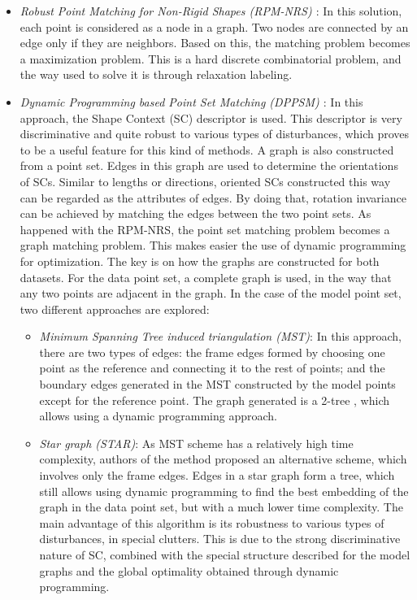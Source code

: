 \begin{itemize}
 \item \textit{Robust Point Matching for Non-Rigid Shapes (RPM-NRS) \citep{zheng2006robust}}: In this solution, each 
point is considered as a node in a graph. Two nodes are connected by an edge only if they are neighbors. Based on this, 
the matching problem becomes a maximization problem. This is a hard discrete combinatorial problem, and the way used to 
solve it is through relaxation labeling.
 \item \textit{Dynamic Programming based Point Set Matching (DPPSM) \citep{lian2012rotation}}: In this approach, the 
Shape Context (SC) descriptor is used. This descriptor is very discriminative and quite robust to various types of 
disturbances, which proves to be a useful feature for this kind of methods. A graph is also 
constructed from a point set. Edges in this graph are used to determine the orientations of SCs. Similar to lengths or 
directions, oriented SCs constructed this way can be regarded as the attributes of edges. By doing that, rotation 
invariance can be achieved by matching the edges between the two point sets. As happened with the RPM-NRS, the point set 
matching problem becomes a graph matching problem. This makes easier the use of dynamic programming for optimization.
 The key is on how the graphs are constructed for both datasets. For the data point set, a complete graph is used, in 
the way that any two points are adjacent in the graph. In the case of the model point set, two different approaches are 
explored:
 \begin{itemize}
  \item \textit{Minimum Spanning Tree induced triangulation (MST)}: In this approach, there are two types of edges: the frame edges formed by choosing one point as the reference and connecting it to the rest of points; and the boundary edges generated in the MST constructed by the model points except for the reference point.
  The graph generated is a 2-tree \citep{west2001introduction}, which allows using a dynamic programming approach.
  \item \textit{Star graph (STAR)}: As MST scheme has a relatively high time complexity, authors of the method proposed an alternative scheme, which involves only the frame edges. Edges in a star graph form a tree, which still allows using dynamic programming to find the best embedding of the graph in the data point set, but with a much lower time complexity.
 The main advantage of this algorithm is its robustness to various types of disturbances, in special clutters. This is due to the strong discriminative nature of SC, combined with the special structure described for the model graphs and the global optimality obtained through dynamic programming.
 \end{itemize}
\end{itemize}

